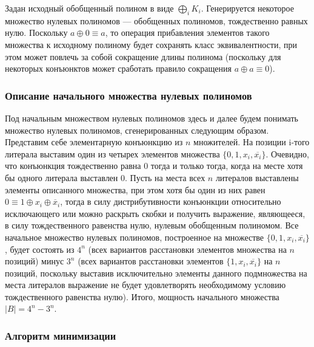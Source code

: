 \documentclass[a4paper,12pt,titlepage]{article}
\begin{document}
Задан исходный обобщенный полином в виде $ \bigoplus\limits_i K_i $. Генерируется некоторое множество нулевых полиномов --- обобщенных полиномов, тождественно равных нулю. Поскольку $ a \oplus 0 \equiv a $, то операция прибавления элементов такого множества к исходному полиному будет сохранять класс эквивалентности, при этом может повлечь за собой сокращение длины полинома (поскольку для некоторых конъюнктов может сработать правило сокращения $ a \oplus a \equiv 0 $).

\subsubsection{Описание начального множества нулевых полиномов}
Под начальным множеством нулевых полиномов здесь и далее будем понимать множество нулевых полиномов, сгенерированных следующим образом.
Представим себе элементарную конъюнкцию из $ n $ множителей. На позиции i-того литерала выставим один из четырех элементов множества $ \{ 0, 1, x_i, \overline{x_i} \} $. Очевидно, что конъюнкция тождественно равна 0 тогда и только тогда, когда на месте хотя бы одного литерала выставлен 0. Пусть на места всех $ n $ литералов выставлены элементы описанного множества, при этом хотя бы один из них равен $ 0 \equiv 1 \oplus x_i \oplus \overline x_i $, тогда в силу дистрибутивности конъюнкции относительно исключающего или можно раскрыть скобки и получить выражение, являющееся, в силу тождественного равенства нулю, нулевым обобщенным полиномом. Все начальное множество нулевых полиномов, построенное на множестве $ \{ 0, 1, x_i, \overline{x_i} \} $, будет состоять из $ 4^n $ (всех вариантов расстановки элементов множества на $ n $ позиций) минус $ 3^n $ (всех вариантов расстановки элементов $ \{ 1, x_i, \overline{x_i} \} $ на $ n $ позиций, поскольку выставив исключительно элементы данного подмножества на места литералов выражение не будет удовлетворять необходимому условию тождественного равенства нулю). Итого, мощность начального множества $ \left| B \right| = 4^n - 3^n. $

\subsubsection{Алгоритм минимизации}
\end{document}
